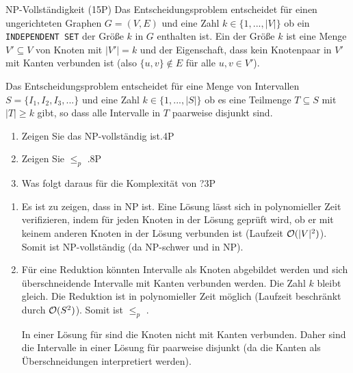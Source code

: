\documentclass{article}
\begin{document}
\begin{exercise}{NP-Vollständigkeit (15P)}
  Das Entscheidungsproblem  entscheidet für einen ungerichteten Graphen $G = (V,E)$ und eine Zahl $k \in \{1,...,|V|\}$ ob ein \texttt{INDEPENDENT SET} der Größe $k$ in $G$ enthalten ist. Ein  der Größe $k$ ist eine Menge $V' \subseteq V$ von Knoten mit $|V'| = k$ und der Eigenschaft, dass kein Knotenpaar in $V'$ mit Kanten verbunden ist (also $\{u, v\} \not\in E$ für alle $u, v \in V'$).\par
  Das Entscheidungsproblem  entscheidet für eine Menge von Intervallen $S = \{I_1,I_2,I_3,...\}$ und eine Zahl $k \in \{1,...,|S|\}$ ob es eine Teilmenge $T \subseteq S$ mit $|T| \geq k$ gibt, so dass alle Intervalle in $T$ paarweise disjunkt sind.
  \begin{enumerate}
    \item Zeigen Sie das  NP-vollständig ist.\hfill 4P
    \item Zeigen Sie  $\leq_p$ .\hfill 8P
    \item Was folgt daraus für die Komplexität von ?\hfill 3P
  \end{enumerate}
  \begin{solution}
    \begin{enumerate}
      \item Es ist zu zeigen, dass  in NP ist. Eine Lösung lässt sich in polynomieller Zeit verifizieren, indem für jeden Knoten in der Lösung geprüft wird, ob er mit keinem anderen Knoten in der Lösung verbunden ist (Laufzeit $\mathcal{O}(|V|^2)$). Somit ist  NP-vollständig (da NP-schwer und in NP).
      \item Für eine Reduktion könnten Intervalle als Knoten abgebildet werden und sich überschneidende Intervalle mit Kanten verbunden werden. Die Zahl $k$ bleibt gleich. Die Reduktion ist in polynomieller Zeit möglich (Laufzeit beschränkt durch $\mathcal{O}(S^2)$). Somit ist  $\leq_p$ .\par
            In einer Lösung für  sind die Knoten nicht mit Kanten verbunden. Daher sind die Intervalle in einer Lösung für  paarweise disjunkt (da die Kanten als Überschneidungen interpretiert werden).\par

\end{enumerate}
\end{solution}
\end{exercise}
\end{document}
